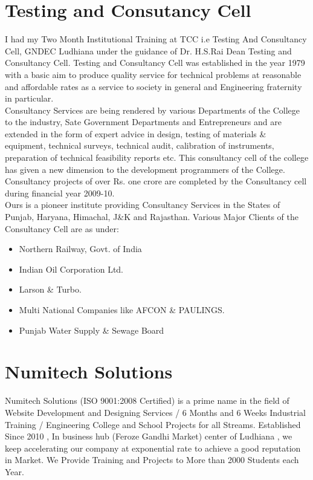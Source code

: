 \section{Testing and Consutancy Cell}

I had my Two Month Institutional Training at TCC i.e Testing And
Consultancy Cell,
GNDEC Ludhiana under the guidance of Dr. H.S.Rai Dean Testing and Consultancy Cell.
Testing and Consultancy Cell was established in the year 1979 with a basic aim to produce
quality service for technical problems at reasonable and affordable rates as a service to society
in general and Engineering fraternity in particular.\\

Consultancy Services are being rendered by various Departments of the College to the
industry, Sate Government Departments and Entrepreneurs and are extended in the form of
expert advice in design, testing of materials \& equipment, technical surveys, technical audit,
calibration of instruments, preparation of technical feasibility reports etc.
This consultancy cell of the college has given a new dimension to the development
programmers of the College. Consultancy projects of over Rs. one crore are completed by the
Consultancy cell during financial year 2009-10. \\

Ours is a pioneer institute providing Consultancy Services in the States of Punjab, Haryana,
Himachal, J\&K and Rajasthan. Various Major Clients of the Consultancy Cell are as under:\\
\begin{itemize}
\item Northern Railway, Govt. of India
\item Indian Oil Corporation Ltd.
\item Larson \& Turbo.
\item Multi National Companies like AFCON \& PAULINGS.
\item Punjab Water Supply \& Sewage Board
\end{itemize}

\section{Numitech Solutions}


Numitech Solutions (ISO 9001:2008 Certified) is a prime name in the field of Website Development and Designing Services / 6 Months and 6 Weeks Industrial Training / Engineering College and School Projects for all Streams. Established Since 2010 , In business hub (Feroze Gandhi Market) center of Ludhiana , we keep accelerating our company at exponential rate to achieve a good reputation in Market. We Provide Training and Projects to More than 2000 Students each Year. \\

